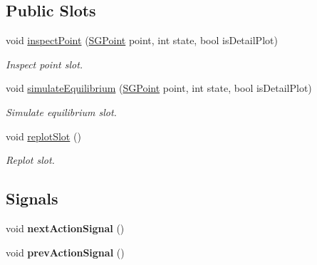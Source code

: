 \subsection*{Public Slots}
\begin{DoxyCompactItemize}
\item 
\mbox{\label{classSGSolutionHandler__V2_aa55671d49ce1ec2a3ef4c6f0dac186d8}} 
void \hyperlink{classSGSolutionHandler__V2_aa55671d49ce1ec2a3ef4c6f0dac186d8}{inspect\+Point} (\hyperlink{classSGPoint}{S\+G\+Point} point, int state, bool is\+Detail\+Plot)
\begin{DoxyCompactList}\small\item\em Inspect point slot. \end{DoxyCompactList}\item 
\mbox{\label{classSGSolutionHandler__V2_a100db3775a69432f861bf1a08cdacec0}} 
void \hyperlink{classSGSolutionHandler__V2_a100db3775a69432f861bf1a08cdacec0}{simulate\+Equilibrium} (\hyperlink{classSGPoint}{S\+G\+Point} point, int state, bool is\+Detail\+Plot)
\begin{DoxyCompactList}\small\item\em Simulate equilibrium slot. \end{DoxyCompactList}\item 
\mbox{\label{classSGSolutionHandler__V2_a16712751d745429a618ee04863e79881}} 
void \hyperlink{classSGSolutionHandler__V2_a16712751d745429a618ee04863e79881}{replot\+Slot} ()
\begin{DoxyCompactList}\small\item\em Replot slot. \end{DoxyCompactList}\end{DoxyCompactItemize}
\subsection*{Signals}
\begin{DoxyCompactItemize}
\item 
\mbox{\label{classSGSolutionHandler__V2_a29271a90bf420b850b7b6aeb12561b12}} 
void {\bfseries next\+Action\+Signal} ()
\item 
\mbox{\label{classSGSolutionHandler__V2_a8139224ee671874b5dd1cda9d7257bf4}} 
void {\bfseries prev\+Action\+Signal} ()
\end{DoxyCompactItemize}
